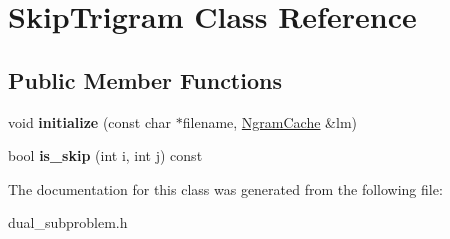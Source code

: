 \hypertarget{classSkipTrigram}{
\section{SkipTrigram Class Reference}
\label{classSkipTrigram}
}
\subsection*{Public Member Functions}
\begin{DoxyCompactItemize}
\item 
\hypertarget{classSkipTrigram_ad6d9414de103a5d6301bb08e93a7b355}{
void {\bfseries initialize} (const char $\ast$filename, \hyperlink{classNgramCache}{NgramCache} \&lm)}
\label{classSkipTrigram_ad6d9414de103a5d6301bb08e93a7b355}

\item 
\hypertarget{classSkipTrigram_aec4850177f6159bed3b74096e6cb0f1c}{
bool {\bfseries is\_\-skip} (int i, int j) const }
\label{classSkipTrigram_aec4850177f6159bed3b74096e6cb0f1c}

\end{DoxyCompactItemize}


The documentation for this class was generated from the following file:\begin{DoxyCompactItemize}
\item 
dual\_\-subproblem.h\end{DoxyCompactItemize}
